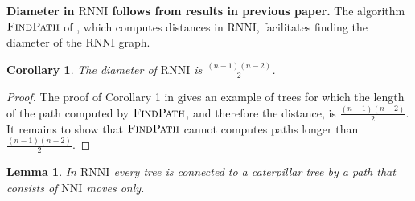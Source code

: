 \documentclass[11pt]{amsart}
\newtheorem{lemma}{Lemma}
\newtheorem{corollary}{Corollary}
\newcommand{\rnni}{\mathrm{RNNI}}
\newcommand{\findpath}{\textsc{FindPath}}
\newcommand{\nni}{\mathrm{NNI}}
\newcommand{\summary}[1]{\textbf{#1}} %
\begin{document}
\summary{Diameter in $\rnni$ follows from results in previous paper.}
The algorithm $\findpath$ of \autocite{Collienne2020-iu}, which computes distances in $\rnni$, facilitates finding the diameter of the $\rnni$ graph.
\begin{corollary}
	The diameter of $\rnni$ is $\frac{(n-1)(n-2)}{2}$.
	\label{cor:diameter_rnni}
\end{corollary}

\begin{proof}
	The proof of Corollary 1 in \autocite{Collienne2020-iu} gives an example of trees for which the length of the path computed by $\findpath$, and therefore the distance, is $\frac{(n-1)(n-2)}{2}$.
	It remains to show that $\findpath$ cannot computes paths longer than $\frac{(n-1)(n-2)}{2}$.
\end{proof}

\begin{lemma}
	In $\rnni$ every tree is connected to a caterpillar tree by a path that consists of $\nni$ moves only.
	\label{lemma:nni_path_to_caterpillar}
\end{lemma}
\end{document}
